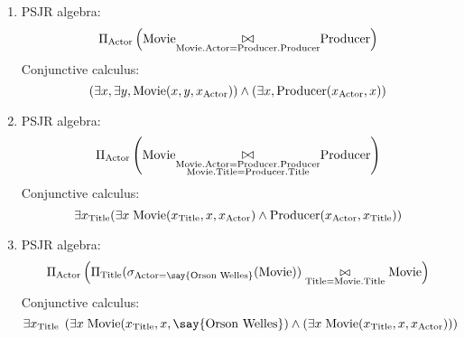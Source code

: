 \documentclass{../../cs-classes/cs-classes}
\newcommand*{\titl}{\textnormal{Title}}
\newcommand*{\movie}{\textnormal{Movie}}
\newcommand*{\actor}{\textnormal{Actor}}
\newcommand*{\producer}{\textnormal{Producer}}
\newcommand{\constant}[1]{\textnormal{\say{#1}}}
\begin{document}
\begin{exercise}
\begin{enumerate}
        \item PSJR algebra:
        \begin{equation*}
            \Pi_{\actor}\left(\movie\underset{\movie.\actor=\producer.\producer}{\mathlarger\bowtie}\producer\right)
        \end{equation*}
        Conjunctive calculus:
        \begin{equation*}
            (\exists x, \exists y, \movie(x, y, x_{\actor})) \land (\exists x, \producer(x_{\actor}, x))
        \end{equation*}

        \item PSJR algebra:
        \begin{equation*}
            \Pi_{\actor}\left(\movie\underset{\substack{\movie.\actor=\producer.\producer\\\movie.\titl=\producer.\titl}}{\mathlarger\bowtie}\producer\right)
        \end{equation*}
        Conjunctive calculus:
        \begin{equation*}
            \exists x_{\titl} (\exists x \; \movie(x_{\titl}, x, x_{\actor}) \land \producer(x_{\actor}, x_{\titl}))
        \end{equation*}

        \item PSJR algebra:
        \begin{equation*}
           \Pi_{\actor}\left(\Pi_{\titl}(\sigma_{\actor=\constant{Orson Welles}}(\movie))\underset{\titl=\movie.\titl}{\bowtie}\movie\right)
        \end{equation*}
        Conjunctive calculus:
        \begin{equation*}
            \exists x_{\titl}\; \left(\exists x\; \movie(x_{\titl}, x, \constant{Orson Welles}) \land (\exists x \; \movie(x_{\titl}, x, x_{\actor}))\right)
        \end{equation*}


\end{enumerate}
\end{exercise}
\end{document}
